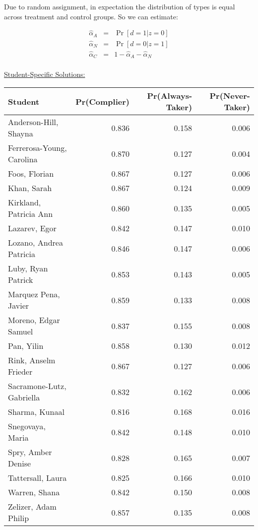 \documentclass[11pt,notitlepage]{article}
\def\Pr{\mathop{\text{Pr}}}
\begin{document}
Due to random assignment, in expectation the distribution of types is equal across treatment and control groups. So we can estimate:

\begin{eqnarray*}
\hat{\alpha}_A &=& \Pr[d=1 | z=0] \\
\hat{\alpha}_N &=& \Pr[d=0 | z=1] \\
\hat{\alpha}_C &=& 1 - \hat{\alpha}_A - \hat{\alpha}_N \\
\end{eqnarray*}

\clearpage

\underline{{\sc Student-Specific Solutions:}}

\begin{table}[h!]
\begin{center}
\begin{tabular}{lrrr}
  \hline
  Student & Pr(Complier) & Pr(Always-Taker) & Pr(Never-Taker) \\ 
  \hline
  Anderson-Hill, Shayna & 0.836 & 0.158 & 0.006 \\ 
  Ferrerosa-Young, Carolina & 0.870 & 0.127 & 0.004 \\ 
  Foos, Florian & 0.867 & 0.127 & 0.006 \\ 
  Khan, Sarah & 0.867 & 0.124 & 0.009 \\ 
  Kirkland, Patricia Ann & 0.860 & 0.135 & 0.005 \\ 
  Lazarev, Egor & 0.842 & 0.147 & 0.010 \\ 
  Lozano, Andrea Patricia & 0.846 & 0.147 & 0.006 \\ 
  Luby, Ryan Patrick & 0.853 & 0.143 & 0.005 \\ 
  Marquez Pena, Javier & 0.859 & 0.133 & 0.008 \\ 
  Moreno, Edgar Samuel & 0.837 & 0.155 & 0.008 \\ 
  Pan, Yilin & 0.858 & 0.130 & 0.012 \\ 
  Rink, Anselm Frieder & 0.867 & 0.127 & 0.006 \\ 
  Sacramone-Lutz, Gabriella & 0.832 & 0.162 & 0.006 \\ 
  Sharma, Kunaal & 0.816 & 0.168 & 0.016 \\ 
  Snegovaya, Maria & 0.842 & 0.148 & 0.010 \\ 
  Spry, Amber Denise & 0.828 & 0.165 & 0.007 \\ 
  Tattersall, Laura & 0.825 & 0.166 & 0.010 \\ 
  Warren, Shana & 0.842 & 0.150 & 0.008 \\ 
  Zelizer, Adam Philip & 0.857 & 0.135 & 0.008 \\ 
   \hline
\end{tabular}
\end{center}
\end{table}
\end{document}
